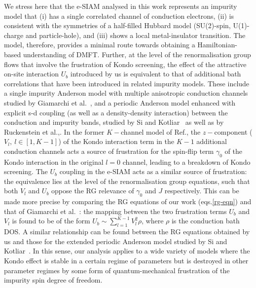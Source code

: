 \documentclass{iopart}
\begin{document}
We stress here that the e-SIAM analysed in this work represents an impurity model that (i) has a single correlated channel of conduction electrons, (ii) is consistent with the symmetries of a half-filled Hubbard model (SU(2)-spin, U(1)-charge and particle-hole), and (iii) shows a local metal-insulator transition. The model, therefore, provides a minimal route towards obtaining a Hamiltonian-based understanding of DMFT. Further, at the level of the renormalisation group flows that involve the frustration of Kondo screening, the effect of the attractive on-site interaction \(U_b\) introduced by us is equivalent to that of additional bath correlations that have been introduced in related impurity models. These include a single impurity Anderson model with multiple anisotropic conduction channels studied by Giamarchi et al.~\cite{giamarchi_varma_1993}, and a periodic Anderson model enhanced with explicit s-d coupling (as well as a density-density interaction) between the conduction and impurity bands, studied by Si and Kotliar~\cite{si_kotliar_1993,kotliar_1996,Si_kotliar_NFL_1993} as well as by Ruckenstein et al.,\cite{ruckenstein1991}. In the former \(K-\)channel model of Ref.\cite{giamarchi_varma_1993}, the \(z-\)component (\(V_l, ~ l\in\left[1, K-1\right] \)) of the Kondo interaction term in the \(K-1\) additional conduction channels acts a source of frustration for the spin-flip term \(\gamma_0\) of the Kondo interaction in the original \(l=0\) channel, leading to a breakdown of Kondo screening. The \(U_b\) coupling in the e-SIAM acts as a similar source of frustration: the equivalence lies at the level of the renormalisation group equations, such that both \(V_l\) and \(U_b\) oppose the RG relevance of \(\gamma_0\) and \(J\) respectively. This can be made more precise by comparing the RG equations of our work (eqs.\eqref{rg-eqn}) and that of Giamarchi et al.~\cite{giamarchi_varma_1993}: the mapping between the two frustration terms \(U_b \) and \(V_l\) is found to be of the form \(U_b \sim \sum_{l=1}^{K-1}V_l^2 \rho\), where \(\rho\) is the conduction bath DOS. A similar relationship can be found between the RG equations obtained by us and those for the extended periodic Anderson model studied by Si and Kotliar~\cite{si_kotliar_1993}. In this sense, our analysis applies to a wide variety of models where the Kondo effect is stable in a certain regime of parameters but is destroyed in other parameter regimes by some form of quantum-mechanical frustration of the impurity spin degree of freedom. 
\end{document}
